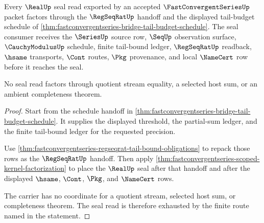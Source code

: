 \begin{theorem}
\label{thm:fastconvergentseries-bridge-real-seal-consumer}
Every $\RealUp$ seal read exported by an accepted $\FastConvergentSeriesUp$ packet factors through the $\RegSeqRatUp$ handoff and the displayed tail-budget schedule of \autoref{thm:fastconvergentseries-bridge-tail-budget-schedule}. The seal consumer receives the $\SeriesUp$ source row, $\SeqUp$ observation surface, $\CauchyModulusUp$ schedule, finite tail-bound ledger, $\RegSeqRatUp$ readback, $\hsame$ transports, $\Cont$ routes, $\Pkg$ provenance, and local $\NameCert$ row before it reaches the seal.

No seal read factors through quotient stream equality, a selected host sum, or an ambient completeness theorem.
\end{theorem}
\begin{proof}
Start from the schedule handoff in \autoref{thm:fastconvergentseries-bridge-tail-budget-schedule}. It supplies the displayed threshold, the partial-sum ledger, and the finite tail-bound ledger for the requested precision.

Use \autoref{thm:fastconvergentseries-regseqrat-tail-bound-obligations} to repack those rows as the $\RegSeqRatUp$ handoff. Then apply \autoref{thm:fastconvergentseries-scoped-kernel-factorization} to place the $\RealUp$ seal after that handoff and after the displayed $\hsame$, $\Cont$, $\Pkg$, and $\NameCert$ rows.

The carrier has no coordinate for a quotient stream, selected host sum, or completeness theorem. The seal read is therefore exhausted by the finite route named in the statement.
\end{proof}

